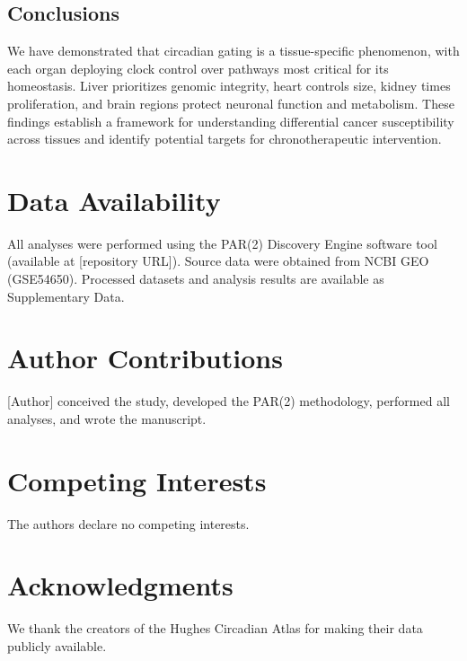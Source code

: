 \documentclass[10pt,letterpaper]{article}
\begin{document}
\subsection{Conclusions}

We have demonstrated that circadian gating is a tissue-specific phenomenon, with each organ deploying clock control over pathways most critical for its homeostasis. Liver prioritizes genomic integrity, heart controls size, kidney times proliferation, and brain regions protect neuronal function and metabolism. These findings establish a framework for understanding differential cancer susceptibility across tissues and identify potential targets for chronotherapeutic intervention.

\section{Data Availability}

All analyses were performed using the PAR(2) Discovery Engine software tool (available at [repository URL]). Source data were obtained from NCBI GEO (GSE54650). Processed datasets and analysis results are available as Supplementary Data.

\section{Author Contributions}

[Author] conceived the study, developed the PAR(2) methodology, performed all analyses, and wrote the manuscript.

\section{Competing Interests}

The authors declare no competing interests.

\section{Acknowledgments}

We thank the creators of the Hughes Circadian Atlas for making their data publicly available.
\end{document}
